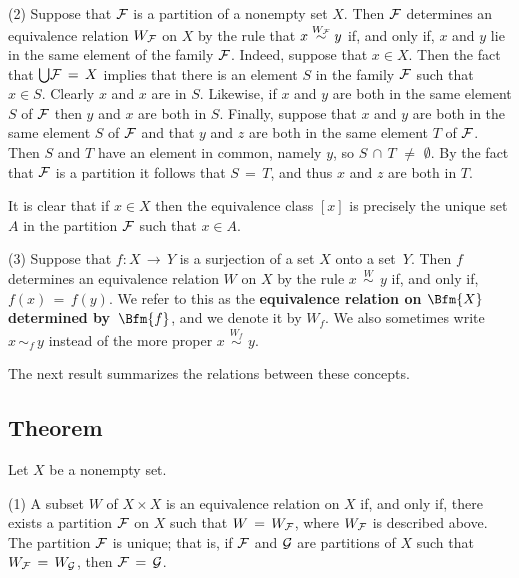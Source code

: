 {\V

        (2) Suppose that ${\cal F}$ is a partition of a nonempty set $X$.
    Then ${\cal F}$ determines an equivalence relation $W_{{\cal F}}$ on $X$ by the rule that $x \stackrel{W_{{\cal F}}}{\,{\sim}\,} y$ if, and only if,
    $x$ and $y$ lie in the same element of the family ${\cal F}$. Indeed, suppose that $x{\in}X$.
    Then the fact that ${\bigcup} {\cal F} \,=\, X$ implies that there is an element $S$ in the family ${\cal F}$ such that $x{\in}S$.
    Clearly $x$ and $x$ are in $S$. Likewise, if $x$ and $y$ are both in the same element $S$ of ${\cal F}$ then $y$ and $x$ are both in $S$.
    Finally, suppose that $x$ and $y$ are both in the same element $S$ of ${\cal F}$ and that $y$ and $z$ are both in the same element $T$ of ${\cal F}$.
    Then $S$ and $T$ have an element in common, namely $y$, so $S\,{\cap}\,T \,\,{\neq}\,\, {\emptyset}$.
    By the fact that ${\cal F}$ is a partition it follows that $S \,=\, T$, and thus $x$ and $z$ are both in $T$.

        It is clear that if $x{\in}X$ then the equivalence class $[x]$ is precisely the unique set $A$ in the partition ${\cal F}$ such that $x{\in}A$.

\V

        (3) Suppose that $f:X \,{\rightarrow}\, Y$ is a surjection of a set $X$ onto a set~$Y$.
    Then $f$ determines an equivalence relation $W$ on $X$ by the rule $x \stackrel{W}{\,\sim\,}y$ if, and only if, $f(x) \,=\, f(y)$.
    We refer to this as the {\bf equivalence relation on $\Bfm{X}$ determined by~$\Bfm{f}$}, and we denote it by $W_{f}$.
    We also sometimes write $x\,{\sim}_{f}\,y$ instead of the more proper $x \stackrel{W_{f}}{\,\sim\,}y$.

\VV

        The next result summarizes the relations between these concepts.

        \subsection{\small{{\bf Theorem}}}
        \label{ThmA50.110}

        Let $X$ be a nonempty set.

\V

        (1) A subset $W$ of $X{\times}X$ is an equivalence relation on $X$ if, and only if,
    there exists a partition ${\cal F}$ on $X$ such that $W \,=\, W_{{\cal F}}$, where $W_{{\cal F}}$ is described above.
    The partition ${\cal F}$ is unique; that is, if ${\cal F}$ and ${\cal G}$ are partitions of $X$ such that $W_{{\cal F}} \,=\, W_{{\cal G}}$, then ${\cal F} \,=\, {\cal G}$.

}
